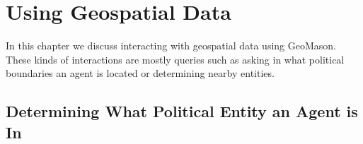 \documentclass[twoside,10pt]{book}
\begin{document}
\chapter{Using Geospatial Data}
\label{ch:using}

In this chapter we discuss interacting with geospatial data using
GeoMason.  These kinds of interactions are mostly queries such as
asking in what political boundaries an agent is located or determining
nearby entities.


\section{Determining What Political Entity an Agent is In}
\label{sec:politicalentity}
\end{document}
